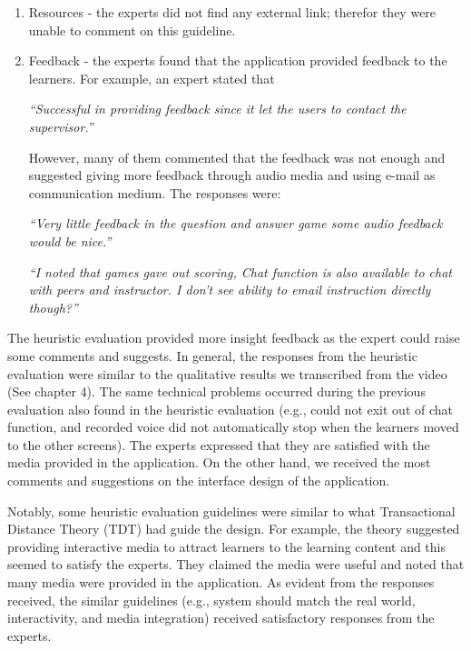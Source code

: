 \begin{enumerate}
\item Resources - the experts did not find any external link; therefor they were unable to comment on this guideline. 

\item Feedback - the experts found that the application provided feedback to the learners. 
For example, an expert stated that
\begin{addmargin}[1.5em]{1.5em}
\textit{``Successful in providing feedback since it let the users to contact the supervisor.''}\end{addmargin}

However, many of them commented that the feedback was not enough and suggested giving more feedback through audio media and using e-mail as communication medium. The responses were: 
\begin{addmargin}[1.5em]{1.5em}
\textit{``Very little feedback in the question and answer game some audio feedback would be nice.''}\end{addmargin}
\begin{addmargin}[1.5em]{1.5em}
\textit{``I noted that games gave out scoring, Chat function is also available to chat with peers and instructor. I don't see ability to email instruction directly though?''}\end{addmargin}
\end{enumerate}

The heuristic evaluation provided more insight feedback as the expert could raise some comments and suggests. In general, the responses from the heuristic evaluation were similar to the qualitative results we transcribed from the video (See chapter 4). The same technical problems occurred during the previous evaluation also found in the heuristic evaluation (e.g., could not exit out of chat function, and recorded voice did not automatically stop when the learners moved to the other screens). The experts expressed that they are satisfied with the media provided in the application. On the other hand, we received the most comments and suggestions on the interface design of the application. 

Notably, some heuristic evaluation guidelines were similar to what Transactional Distance Theory (TDT) had guide the design. For example, the theory suggested providing interactive media to attract learners to the learning content and this seemed to satisfy the experts. They claimed the media were useful and noted that many media were provided in the application. As evident from the responses received, the similar guidelines (e.g., system should match the real world, interactivity, and media integration) received satisfactory responses from the experts. 

